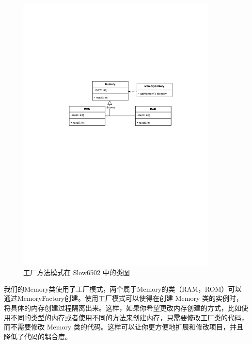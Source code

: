 \begin{figure}[H]
  \centering
  \includegraphics[width=0.9\textwidth]{figures/工厂.pdf}
  \caption{工厂方法模式在 Slow6502 中的类图}
\end{figure}

我们的Memory类使用了工厂模式，两个属于Memory的类（RAM，ROM）可以通过MemoryFactory创建。使用工厂模式可以使得在创建 Memory 类的实例时，将具体的内存创建过程隔离出来。这样，如果你希望更改内存创建的方式，比如使用不同的类型的内存或者使用不同的方法来创建内存，只需要修改工厂类的代码，而不需要修改 Memory 类的代码。这样可以让你更方便地扩展和修改项目，并且降低了代码的耦合度。

